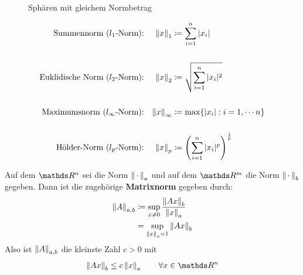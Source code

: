\begin{Wdhe}[Normen]
  \label{3.2.3}
  \begin{figure}
    \centering
    \caption{Sphären mit gleichem Normbetrag}
  \end{figure}
  
  \begin{align*}
    \text{Summennorm ($l_1$-Norm):} &&	\nn{x}_1 &\coloneqq \sum_{i=1}^{n}|x_i| 
                                                   \index{Norm!Summennorm}\\
    \\
    \text{Euklidische Norm ($l_2$-Norm):} &&	\nn{x}_2 &\coloneqq \sqrt{\sum_{i=1}^{n}|x_i|^2}
                                                           \index{Norm!Euklidische Norm} \\
    \\
    \text{Maximumsnorm ($l_\infty$-Norm):} &&\nn{x}_\infty &\coloneqq \max\{|x_i| : i=1, \cdots n\} \\
    \index{Norm!Maximumsnorm}
    \\
    \text{Hölder-Norm ($l_p$-Norm):} &&	\nn{x}_p &\coloneqq 
                                                   \left(\sum_{i=1}^{n}|x_i|^p\right)^{\frac{1}{p}} 
                                                   \index{Norm!Hölder-Norm}
  \end{align*}
\end{Wdhe}



\begin{Defe}
  \label{3.2.4}
  Auf dem $\R^n$  sei die Norm $\left\| \,\cdot\, \right\|_a$ und auf dem $\R^m$ die Norm $\left\| \,\cdot\, \right\|_b$ gegeben.
  Dann ist die zugehörige \textbf{Matrixnorm}  gegeben durch:
  \begin{align}
    \left\| A \right\|_{a,b} &\coloneqq \sup_{x\neq 0} \frac{\left\| Ax \right\|_b}{\left\| x \right\|_a} \\ \nonumber
                 &= \sup_{\left\| x \right\|_a=1} \left\| Ax \right\|_b \label{III.2.1} 
  \end{align}
  Also ist   $\left\| A \right\|_{a,b}$ die kleinste Zahl $c>0$ mit
  \begin{gather*}
    \nn{Ax}_b  \leq c\nn{x}_a \quad\quad \forall x\in \R^n
  \end{gather*}
\end{Defe}

